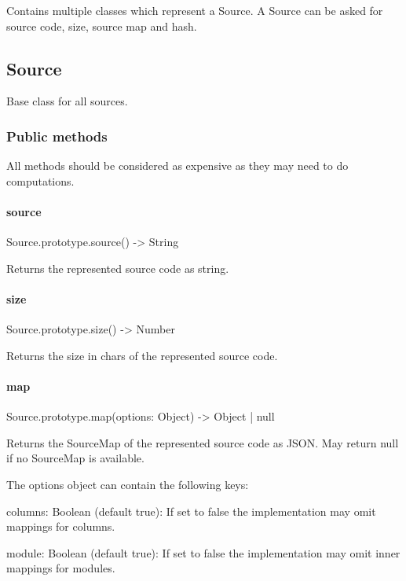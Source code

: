 Contains multiple classes which represent a {\ttfamily Source}. A {\ttfamily Source} can be asked for source code, size, source map and hash.

\subsection*{{\ttfamily Source}}

Base class for all sources.

\subsubsection*{Public methods}

All methods should be considered as expensive as they may need to do computations.

\paragraph*{{\ttfamily source}}


\begin{DoxyCode}
Source.prototype.source() -> String
\end{DoxyCode}


Returns the represented source code as string.

\paragraph*{{\ttfamily size}}


\begin{DoxyCode}
Source.prototype.size() -> Number
\end{DoxyCode}


Returns the size in chars of the represented source code.

\paragraph*{{\ttfamily map}}


\begin{DoxyCode}
Source.prototype.map(options: Object) -> Object | null
\end{DoxyCode}


Returns the Source\+Map of the represented source code as J\+S\+ON. May return {\ttfamily null} if no Source\+Map is available.

The {\ttfamily options} object can contain the following keys\+:


\begin{DoxyItemize}
\item {\ttfamily columns\+: Boolean} (default {\ttfamily true})\+: If set to false the implementation may omit mappings for columns.
\item {\ttfamily module\+: Boolean} (default {\ttfamily true})\+: If set to false the implementation may omit inner mappings for modules.
\end{DoxyItemize}

